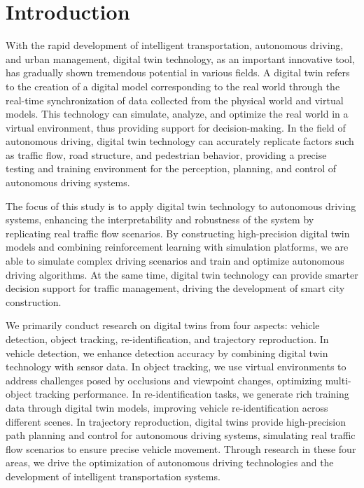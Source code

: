 \section{Introduction}
\label{sec:intro}

With the rapid development of intelligent transportation, autonomous driving, and urban management, digital twin technology, as an important innovative tool, has gradually shown tremendous potential in various fields\cite{Alpher17}. 
A digital twin refers to the creation of a digital model corresponding to the real world through the real-time synchronization of data collected from the physical world and virtual models\cite{Alpher20c}. 
This technology can simulate, analyze, and optimize the real world in a virtual environment, thus providing support for decision-making\cite{Alpher21b}. 
In the field of autonomous driving, digital twin technology can accurately replicate factors such as traffic flow, road structure, and pedestrian behavior, providing a precise testing and training environment for the perception, planning, and control of autonomous driving systems\cite{Alpher24}\cite{Alpher20d}.

The focus of this study is to apply digital twin technology to autonomous driving systems, enhancing the interpretability and robustness of the system by replicating real traffic flow scenarios\cite{Alpher24b}. 
By constructing high-precision digital twin models and combining reinforcement learning with simulation platforms, we are able to simulate complex driving scenarios and train and optimize autonomous driving algorithms\cite{Alpher22c}. 
At the same time, digital twin technology can provide smarter decision support for traffic management, driving the development of smart city construction\cite{Alpher17b}.

We primarily conduct research on digital twins from four aspects: vehicle detection, object tracking, re-identification, and trajectory reproduction. 
In vehicle detection, we enhance detection accuracy by combining digital twin technology with sensor data. 
In object tracking, we use virtual environments to address challenges posed by occlusions and viewpoint changes, optimizing multi-object tracking performance. 
In re-identification tasks, we generate rich training data through digital twin models, improving vehicle re-identification across different scenes. 
In trajectory reproduction, digital twins provide high-precision path planning and control for autonomous driving systems, simulating real traffic flow scenarios to ensure precise vehicle movement. 
Through research in these four areas, we drive the optimization of autonomous driving technologies and the development of intelligent transportation systems.

